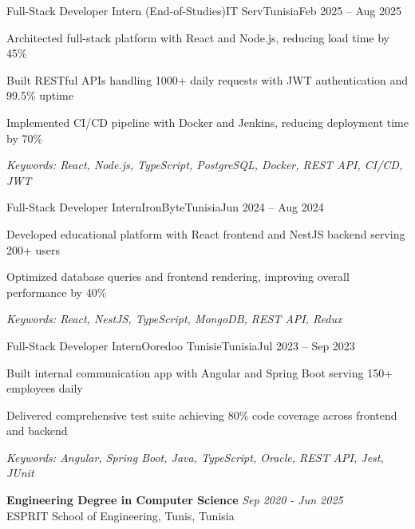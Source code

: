 \documentclass[11pt,a4paper]{article}
\begin{document}
\makecvheader
\makecontactinfo


\begin{internship}{Full-Stack Developer Intern (End-of-Studies)}{IT Serv}{Tunisia}{Feb 2025 -- Aug 2025}{}
  \item Architected full-stack platform with React and Node.js, reducing load time by 45\%
  \item Built RESTful APIs handling 1000+ daily requests with JWT authentication and 99.5\% uptime
  \item Implemented CI/CD pipeline with Docker and Jenkins, reducing deployment time by 70\%
  \item[] \textit{\footnotesize Keywords: React, Node.js, TypeScript, PostgreSQL, Docker, REST API, CI/CD, JWT}
\end{internship}

\begin{internship}{Full-Stack Developer Intern}{IronByte}{Tunisia}{Jun 2024 -- Aug 2024}{}
  \item Developed educational platform with React frontend and NestJS backend serving 200+ users
  \item Optimized database queries and frontend rendering, improving overall performance by 40\%
  \item[] \textit{\footnotesize Keywords: React, NestJS, TypeScript, MongoDB, REST API, Redux}
\end{internship}

\begin{internship}{Full-Stack Developer Intern}{Ooredoo Tunisie}{Tunisia}{Jul 2023 -- Sep 2023}{}
  \item Built internal communication app with Angular and Spring Boot serving 150+ employees daily
  \item Delivered comprehensive test suite achieving 80\% code coverage across frontend and backend
  \item[] \textit{\footnotesize Keywords: Angular, Spring Boot, Java, TypeScript, Oracle, REST API, Jest, JUnit}
\end{internship}

\textbf{Engineering Degree in Computer Science} \hfill \textit{Sep 2020 - Jun 2025}\\[-2pt]
ESPRIT School of Engineering, Tunis, Tunisia
\end{document}
